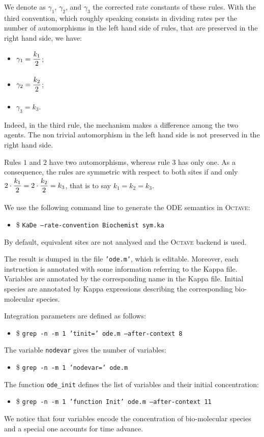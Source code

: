 \documentclass[11pt]{book}
\def\ttt#1{\texttt{#1}}
\def\ITE#1{\begin{itemize}#1\end{itemize}}
\begin{document}
We denote as $\gamma_1$, $\gamma_2$, and $\gamma_3$ the corrected rate constants of these rules. With the third convention, which roughly speaking consists in dividing rates per the number of automorphisms in the left hand side of rules, that are preserved in the right hand side, we have:
\begin{itemize}
  \item $\gamma_1 = \frac{\strut \displaystyle k_1}{\strut \displaystyle 2}$;
  \item $\gamma_2 = \frac{\strut \displaystyle k_2}{\strut \displaystyle 2}$;
  \item $\gamma_3 = k_3$.
\end{itemize}
Indeed, in the third rule, the mechanism makes a difference among the two agents. The non trivial automorphism in the left hand side is not preserved in the right hand side.


Rules $1$ and $2$ have two automorphisms, whereas rule $3$ has only one.
As a consequence, the rules are symmetric with respect to both sites if and only $2\cdot\frac{\strut \displaystyle k_1}{\strut \displaystyle 2}=2\cdot\frac{\strut \displaystyle k_2}{\strut \displaystyle 2}=k_3$, that is to say $k_1=k_2=k_3$.


We use the following command line to generate the ODE semantics in \textsc{Octave}:
\ITE{
\item[\$] \ttt{KaDe --rate-convention Biochemist sym.ka}}

By default, equivalent sites are not analysed and the \textsc{Octave} backend is used.

The result is dumped in the file \texttt{'ode.m'}, which  is editable. Moreover, each instruction is annotated with some information referring to the Kappa file. Variables are annotated by the corresponding name in the Kappa file. Initial species are annotated by Kappa expressions describing the corresponding bio-molecular species.


\lstset{numbers=none}

Integration parameters are defined as follows:
\ITE{
\item[\$] \ttt{grep -n -m 1 'tinit=' ode.m --after-context 8}}


The variable \texttt{nodevar} gives the number of variables:
\ITE{
\item[\$] \ttt{grep -n -m 1 'nodevar=' ode.m}}


The function \texttt{ode\_init} defines the list of variables and their initial concentration:
\ITE{
\item[\$] \ttt{grep -n -m 1 'function Init' ode.m --after-context 11 }}

We notice that four variables encode the concentration of bio-molecular species and a special one accounts for time advance.
\end{document}
